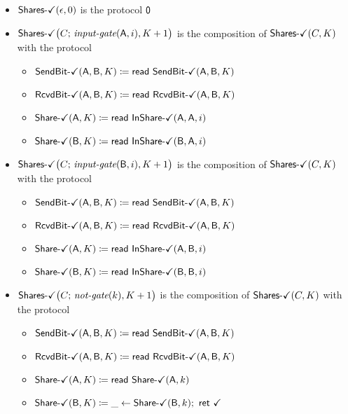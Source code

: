 \begin{itemize}
\item $\SharesOk(\epsilon,0)$ is the protocol $\zero$

\item $\SharesOk\big(C; \, \inputgate(\A,i),K+1\big)$ is the composition of $\SharesOk(C,K)$ with the protocol
\begin{itemize}
\item {\color{teal} $\SendBitOk(\A,\B,K) \coloneqq \read{\SendBitOk(\A,\B,K)}$}
\item {\color{teal} $\RcvdBitOk(\A,\B,K) \coloneqq \read{\RcvdBitOk(\A,\B,K)}$}
\item {\color{teal} $\ShareOk(\A,K) \coloneqq \read{\InShareOk(\A,\A,i)}$}
\item {\color{teal} $\ShareOk(\B,K) \coloneqq \read{\InShareOk(\B,\A,i)}$}
\end{itemize}

\item $\SharesOk\big(C; \, \inputgate(\B,i),K+1\big)$ is the composition of $\SharesOk(C,K)$ with the protocol
\begin{itemize}
\item {\color{teal} $\SendBitOk(\A,\B,K) \coloneqq \read{\SendBitOk(\A,\B,K)}$}
\item {\color{teal} $\RcvdBitOk(\A,\B,K) \coloneqq \read{\RcvdBitOk(\A,\B,K)}$}
\item {\color{teal} $\ShareOk(\A,K) \coloneqq \read{\InShareOk(\A,\B,i)}$}
\item {\color{teal} $\ShareOk(\B,K) \coloneqq \read{\InShareOk(\B,\B,i)}$}
\end{itemize}

\item $\SharesOk\big(C; \, \notgate(k),K+1\big)$ is the composition of $\SharesOk(C,K)$ with the protocol
\begin{itemize}
\item {\color{teal} $\SendBitOk(\A,\B,K) \coloneqq \read{\SendBitOk(\A,\B,K)}$}
\item {\color{teal} $\RcvdBitOk(\A,\B,K) \coloneqq \read{\RcvdBitOk(\A,\B,K)}$}
\item {\color{teal} $\ShareOk(\A,K) \coloneqq \read{\ShareOk(\A,k)}$}
\item {\color{teal} $\ShareOk(\B,K) \coloneqq \_ \leftarrow \ShareOk(\B,k); \ \ret{\checkmark}$}
\end{itemize}


\end{itemize}
